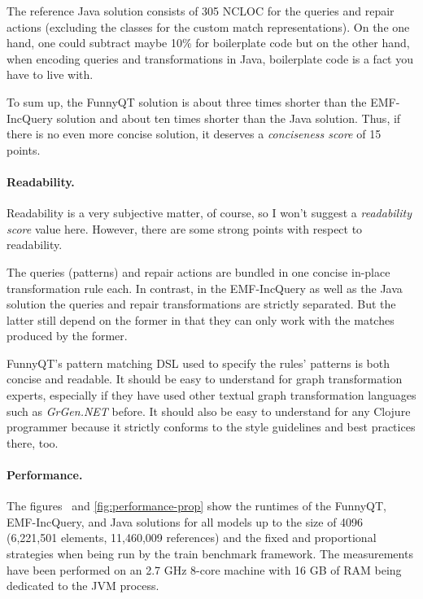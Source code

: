 \documentclass[submission]{eptcs}
\begin{document}
The reference Java solution consists of 305 NCLOC for the queries and repair
actions (excluding the classes for the custom match representations).  On the
one hand, one could subtract maybe 10\% for boilerplate code but on the other
hand, when encoding queries and transformations in Java, boilerplate code is a
fact you have to live with.

To sum up, the FunnyQT solution is about three times shorter than the
EMF-IncQuery solution and about ten times shorter than the Java solution.
Thus, if there is no even more concise solution, it deserves a
\emph{conciseness score} of 15 points.

\paragraph{Readability.}

Readability is a very subjective matter, of course, so I won't suggest a
\emph{readability score} value here.  However, there are some strong points
with respect to readability.

\begin{compactitem}
\item The queries (patterns) and repair actions are bundled in one concise
  in-place transformation rule each.  In contrast, in the EMF-IncQuery as well
  as the Java solution the queries and repair transformations are strictly
  separated.  But the latter still depend on the former in that they can only
  work with the matches produced by the former.
\item FunnyQT's pattern matching DSL used to specify the rules' patterns is
  both concise and readable.  It should be easy to understand for graph
  transformation experts, especially if they have used other textual graph
  transformation languages such as \emph{GrGen.NET} before.  It should also be
  easy to understand for any Clojure programmer because it strictly conforms to
  the style guidelines and best practices there, too.
\end{compactitem}

\paragraph{Performance.}

The figures~ and \vref{fig:performance-prop} show
the runtimes of the FunnyQT, EMF-IncQuery, and Java solutions for all models up
to the size of 4096 (6,221,501 elements, 11,460,009 references) and the fixed
and proportional strategies when being run by the train benchmark framework.
The measurements have been performed on an 2.7 GHz 8-core machine with 16 GB of
RAM being dedicated to the JVM process.
\end{document}
